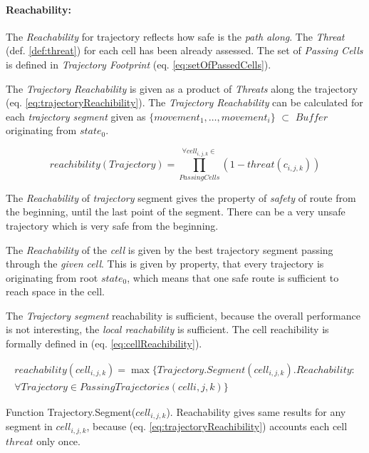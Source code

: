 \paragraph{Reachability:} The \emph{Reachability} for trajectory reflects how safe is the \emph{path along}. The \emph{Threat} (def. \ref{def:threat}) for each cell has been already assessed.  The set of \emph{Passing Cells} is defined in \emph{Trajectory Footprint} (eq. \ref{eq:setOfPassedCells}).

The \emph{Trajectory Reachability} is given as a product of \emph{Threats} along the trajectory (eq. \ref{eq:trajectoryReachibility}). The \emph{Trajectory Reachability} can be calculated for each \emph{trajectory segment} given as $\{movement_1,\dots,movement_i\}$ $\subset$ $Buffer$ originating from $state_0$.


\begin{equation}\label{eq:trajectoryReachibility}
    reachibility(Trajectory) = \prod_{Passing Cells}^{\forall cell_{i,j,k}\in} \left(1- threat(c_{i,j,k})\right)
\end{equation}

\begin{note}
    The \emph{Reachability} of \emph{trajectory} segment gives the property of \emph{safety} of route from the beginning, until the last point of the segment. There can be a very unsafe trajectory which is very safe from the beginning.
\end{note}


The \emph{Reachability} of the \emph{cell} is given by the best trajectory segment passing through the \emph{given cell}. This is given by property, that every trajectory is originating from root $state_0$, which means that one safe route is sufficient to reach space in the cell.

The \emph{Trajectory segment} reachability is sufficient, because the overall performance is not interesting, the \emph{local reachability} is sufficient. The cell reachibility is formally defined in (eq. \ref{eq:cellReachibility}).

\begin{multline}\label{eq:cellReachibility}
    reachability(cell_{i,j,k}) = \max\{Trajectory.Segment(cell_{i,j,k}). Reachability: \\\forall Trajectory \in Passing Trajectories (cell{i,j,k})\}
\end{multline}
    
\begin{note}
    Function Trajectory.Segment($cell_{i,j,k}$). Reachability gives same results for any segment in $cell_{i,j,k}$, because (eq. \ref{eq:trajectoryReachibility}) accounts each cell $threat$ only once.
\end{note}

